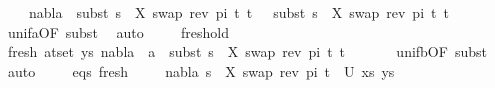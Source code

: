 \begin{isabellebody}
\ \ \ \ nabla{}\ {\isasymturnstile}\ subst\ {\isacharparenleft}{\kern0pt}s{}\ {\isasymbullet}\ {\isacharbrackleft}{\kern0pt}{\isacharparenleft}{\kern0pt}X{\isacharcomma}{\kern0pt}\ swap\ {\isacharparenleft}{\kern0pt}rev\ pi{\isacharparenright}{\kern0pt}\ t{\isacharprime}{\kern0pt}{\isacharparenright}{\kern0pt}{\isacharbrackright}{\kern0pt}{\isacharparenright}{\kern0pt}\ t{}\ {\isasymapprox}\ \ subst\ {\isacharparenleft}{\kern0pt}s{}\ {\isasymbullet}\ {\isacharbrackleft}{\kern0pt}{\isacharparenleft}{\kern0pt}X{\isacharcomma}{\kern0pt}\ swap\ {\isacharparenleft}{\kern0pt}rev\ pi{\isacharparenright}{\kern0pt}\ t{\isacharprime}{\kern0pt}{\isacharparenright}{\kern0pt}{\isacharbrackright}{\kern0pt}{\isacharparenright}{\kern0pt}\ t{}{\isachardoublequoteclose}\isanewline
\ \ \ \ \ \isamarkupfalse%
\ unif{\isacharunderscore}{\kern0pt}{}a{\isacharbrackleft}{\kern0pt}OF\ subst{\isacharbrackright}{\kern0pt}\ \isamarkupfalse%
\ auto\isanewline
\isanewline
\ \ \ \isamarkupfalse%
\ fresh{\isacharunderscore}{\kern0pt}old\ \isanewline
\ \ \ \isamarkupfalse%
\ fresh{\isacharcolon}{\kern0pt}\ {\isachardoublequoteopen}{\isasymforall}{\isacharparenleft}{\kern0pt}a{\isacharcomma}{\kern0pt}t{\isacharparenright}{\kern0pt}{\isasymin}set\ ys{\isachardot}{\kern0pt}\ nabla{}\ {\isasymturnstile}\ a\ {\isasymsharp}\ subst\ {\isacharparenleft}{\kern0pt}s{}\ {\isasymbullet}\ {\isacharbrackleft}{\kern0pt}{\isacharparenleft}{\kern0pt}X{\isacharcomma}{\kern0pt}\ swap\ {\isacharparenleft}{\kern0pt}rev\ pi{\isacharparenright}{\kern0pt}\ t{\isacharprime}{\kern0pt}{\isacharparenright}{\kern0pt}{\isacharbrackright}{\kern0pt}{\isacharparenright}{\kern0pt}\ t{\isachardoublequoteclose}\isanewline
\ \ \ \ \ \isamarkupfalse%
\ unif{\isacharunderscore}{\kern0pt}{}b{\isacharbrackleft}{\kern0pt}OF\ subst{\isacharbrackright}{\kern0pt}\ \isamarkupfalse%
\ auto\isanewline
\isanewline
\ \ \ \isamarkupfalse%
\ eqs\ fresh\isanewline
\ \ \ \isamarkupfalse%
\ {\isachardoublequoteopen}{\isacharparenleft}{\kern0pt}nabla{}{\isacharcomma}{\kern0pt}\ {\isacharparenleft}{\kern0pt}s{}\ {\isasymbullet}\ {\isacharbrackleft}{\kern0pt}{\isacharparenleft}{\kern0pt}X{\isacharcomma}{\kern0pt}\ swap\ {\isacharparenleft}{\kern0pt}rev\ pi{\isacharparenright}{\kern0pt}\ t{\isacharprime}{\kern0pt}{\isacharparenright}{\kern0pt}{\isacharbrackright}{\kern0pt}{\isacharparenright}{\kern0pt}{\isacharparenright}{\kern0pt}\ {\isasymin}\ U\ {\isacharparenleft}{\kern0pt}xs{\isacharcomma}{\kern0pt}\ ys{\isacharparenright}{\kern0pt}{\isachardoublequoteclose}\isanewline

\end{isabellebody}
